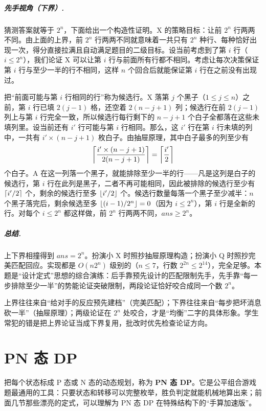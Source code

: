 \paragraph{先手视角（下界）.} 猜测答案就等于 $2^{n}$，下面给出一个构造性证明。X 的策略目标：让前 $2^{n}$ 行两两不同。由上面的上界，前 $2^{n}$ 行两两不同就意味着一共只有 $2^{n}$ 种行、每种恰好出现一次，得分直接拉满且自动满足题目的二级目标。设当前考虑到了第 $i$ 行（$i\le2^{n}$），我们论证 X 可以让第 $i$ 行与前面所有行都不相同。考虑让每次决策保证第 $i$ 行与至少一半的行不相同，这样 $n$ 个回合后就能保证第 $i$ 行在之前没有出现过。

把“前面可能与第 $i$ 行相同的行”称为候选行。X 落第 $j$ 个黑子（$1\le j\le n$）之前，第 $i$ 行已填 $2(j-1)$ 格，还空着 $2(n-j+1)$ 列；候选行在前 $2(j-1)$ 列上与第 $i$ 行完全一致，所以候选行每行剩下的 $n-j+1$ 个白子全都落在这些未填列里。设当前还有 $i'$ 行可能与第 $i$ 行相同。那么，这 $i'$ 行在第 $i$ 行未填的列中，一共有 $i'\times(n-j+1)$ 枚白子。由抽屉原理，其中白子最多的列至少有
\[
 \left\lceil \frac{i'\times(n-j+1)}{2(n-j+1)}\right\rceil=\left\lceil \frac{i'}{2}\right\rceil
\]
个白子。A 在这一列落一个黑子，就能排除至少一半的行——凡是这列是白子的候选行，第 $i$ 行在此列是黑子，二者不再可能相同，因此被排除的候选行至少有 $\left\lceil i'/2\right\rceil$ 个，剩余的候选行至多 $\left\lfloor i'/2\right\rfloor$ 个。候选行数量每落一个黑子至少减半：$n$ 个黑子落完后，剩余候选至多 $\left\lfloor (i-1)/2^{n}\right\rfloor=0$（因为 $i\le2^{n}$），第 $i$ 行是全新的行。对每个 $i\le2^{n}$ 都这样做，前 $2^{n}$ 行两两不同，$ans\ge2^{n}$。

\paragraph{总结.} 上下界相撞得到 $ans=2^{n}$。扮演小 X 时照抄抽屉原理构造；扮演小 Q 时照抄完美匹配回应。实现都是 $O(n2^{n})$ 级别的（$n\le7$，行数 $2^{2n}\le2^{14}$），完全足够。本题是“设计定式”思想的综合演练：后手靠预先设计的匹配限制先手，先手靠“每一步排除至少一半”的势能论证突破限制，两段论证恰好咬合成同一个数 $2^{n}$。


\begin{teach}[这道题的三个教学收获]
上界往往来自“给对手的反应预先建档”（完美匹配）；下界往往来自“每步把坏消息砍一半”（抽屉原理）；两级论证在 $2^{n}$ 处咬合，才是“均衡”二字的具体形象。学生常犯的错是把上界论证当成下界复用，批改时优先检查论证方向。
\end{teach}
\chapter{PN 态 DP}
把每个状态标成 P 态或 N 态的动态规划，称为 \textbf{PN 态 DP}。它是公平组合游戏题最通用的工具：只要状态和转移可以完整枚举，胜负判定就能机械地算出来；前面几节那些漂亮的定式，可以理解为 PN 态 DP 在特殊结构下的“手算加速版”。

